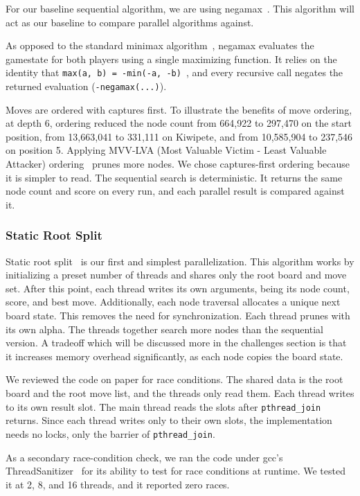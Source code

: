 \documentclass[10pt, conference, compsocconf]{IEEEtran}
\begin{document}
For our baseline sequential algorithm, we are using negamax~\cite{knuth1975}. This algorithm will act as our baseline to compare parallel algorithms against.

As opposed to the standard minimax algorithm~\cite{shannon1950}, negamax evaluates the gamestate for both players using a single maximizing function. It relies on the identity that \mbox{\texttt{max(a, b) = -min(-a, -b)}}~\cite{knuth1975}, and every recursive call negates the returned evaluation (\mbox{\texttt{-negamax(...)}}).

Moves are ordered with captures first. To illustrate the benefits of move ordering, at depth 6, ordering reduced the node count from 664,922 to 297,470 on the start position, from 13,663,041 to 331,111 on Kiwipete, and from 10,585,904 to 237,546 on position 5. Applying MVV-LVA (Most Valuable Victim - Least Valuable Attacker) ordering~\cite{cpwmvvlva} prunes more nodes. We chose captures-first ordering because it is simpler to read. The sequential search is deterministic. It returns the same node count and score on every run, and each parallel result is compared against it.

\subsubsection*{Static Root Split}

Static root split~\cite{marsland1982} is our first and simplest parallelization. This algorithm works by initializing a preset number of threads and shares only the root board and move set. After this point, each thread writes its own arguments, being its node count, score, and best move. Additionally, each node traversal allocates a unique next board state. This removes the need for synchronization. Each thread prunes with its own alpha. The threads together search more nodes than the sequential version. A tradeoff which will be discussed more in the challenges section is that it increases memory overhead significantly, as each node copies the board state.

We reviewed the code on paper for race conditions. The shared data is the root board and the root move list, and the threads only read them. Each thread writes to its own result slot. The main thread reads the slots after \texttt{pthread\_join}~\cite{posix1995} returns. Since each thread writes only to their own slots, the implementation needs no locks, only the barrier of \texttt{pthread\_join}.

As a secondary race-condition check, we ran the code under gcc's ThreadSanitizer~\cite{serebryany2009} for its ability to test for race conditions at runtime. We tested it at 2, 8, and 16 threads, and it reported zero races.
\end{document}
